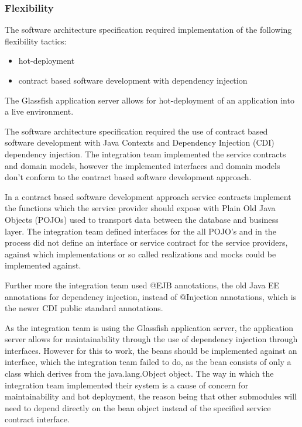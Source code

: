 \documentclass[a4paper,10pt]{article}
\begin{document}
\subsubsection{Flexibility}
The software architecture specification required implementation of the following flexibility tactics:
\begin{itemize}
	\item hot-deployment
	\item contract based software development with dependency injection
\end{itemize}

The Glassfish application server allows for hot-deployment of an application into a live environment.

The software architecture specification required the use of contract based software development with Java Contexts and Dependency Injection (CDI) dependency injection.  The integration team implemented the service contracts and domain models, however the implemented interfaces and domain models don't conform to the contract based software development approach.

In a contract based software development approach service contracts implement the functions which the service provider should expose with Plain Old Java Objects (POJOs) used to transport data between the database and business layer.  The integration team defined interfaces for the all POJO's and in the process did not define an interface or service contract for the service providers, against which implementations or so called realizations and mocks could be implemented against.

Further more the integration team used @EJB annotations, the old Java EE annotations for dependency injection, instead of @Injection annotations, which is the newer CDI public standard annotations.

As the integration team is using the Glassfish application server, the application server allows for maintainability through the use of dependency injection through interfaces.  However for this to work, the beans should be implemented against an interface, which the integration team failed to do, as the bean consists of only a class which derives from the java.lang.Object object. The way in which the integration team implemented their system is a cause of concern for maintainability and hot deployment, the reason being that other submodules will need to depend directly on the bean object instead of the specified service contract interface.
\end{document}
